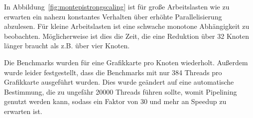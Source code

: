 In Abbildung~\ref{fig:montepistrongscaling} ist für große Arbeitslasten wie zu erwarten ein nahezu konstantes Verhalten über erhöhte Parallelisierung abzulesen. Für kleine Arbeitslasten ist eine schwache monotone Abhängigkeit zu beobachten. Möglicherweise ist dies die Zeit, die eine Reduktion über 32 Knoten länger braucht als z.B. über vier Knoten.

Die Benchmarks wurden für eine Grafikkarte pro Knoten wiederholt. Außerdem wurde leider festgestellt, dass die Benchmarks mit nur 384 Threads pro Grafikkarte ausgeführt wurden. Dies wurde geändert auf eine automatische Bestimmung, die zu ungefähr 20000 Threads führen sollte, womit Pipelining genutzt werden kann, sodass ein Faktor von 30 und mehr an Speedup zu erwarten ist.
